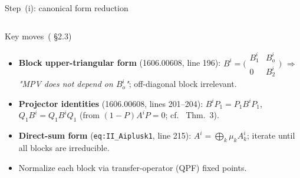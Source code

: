 \documentclass[aspectratio=169,10pt]{beamer}
\begin{document}
\begin{frame}{Step~(i): canonical form reduction~\cite{Cirac2017Annals,Cirac2021Matrix}}
    \vspace{-0.7em}

    \begin{columns}[T]
        \begin{block}{Key moves~(\cite{Cirac2017Annals} \S2.3)}
            \begin{itemize}\itemsep0.18em
                \item[(1)] \textbf{Block upper-triangular form} (1606.00608, line 196):
                      $B^i = \bigl(\begin{smallmatrix}B_1^i & B_o^i\\0&B_2^i\end{smallmatrix}\bigr)$
                      $\Rightarrow$ \textit{"MPV does not depend on $B^i_o$"};
                      off-diagonal block irrelevant.
                \item[(2)] \textbf{Projector identities} (1606.00608, lines 201--204):
                      $B^i P_1 = P_1 B^i P_1$,\;
                      $Q_1 B^i = Q_1 B^i Q_1$\;
                      (from $(1{-}P)A^i P = 0$;
                      cf.\ \cite{Perez-Garcia2007Matrix} Thm.~3).
                \item[(3)] \textbf{Direct-sum form} (\texttt{eq:II\_Aiplusk1}, line 215):
                      $A^i = \bigoplus_k \mu_k A_k^i$;
                      iterate until all blocks are irreducible.
                \item[(4)] Normalize each block via transfer-operator
                      (QPF) fixed points.
            \end{itemize}
        \end{block}


\end{columns}
\end{frame}
\end{document}
